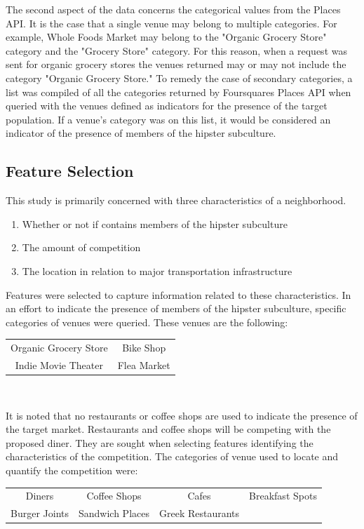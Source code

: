 \documentclass[12pt]{article}
\begin{document}
	The second aspect of the data concerns the categorical values from the Places API.
	It is the case that a single venue may belong to multiple categories.
	For example, Whole Foods Market may belong to the "Organic Grocery Store" category and the "Grocery Store" category.
	For this reason, when a request was sent for organic grocery stores the venues returned may or may not include the category "Organic Grocery Store."
	To remedy the case of secondary categories, a list was compiled of all the categories returned by Foursquares Places API when queried with the venues defined as indicators for the presence of the target population.
	If a venue's category was on this list, it would be considered an indicator of the presence of members of the hipster subculture.

\subsection{Feature Selection}
	This study is primarily concerned with three characteristics of a neighborhood.
	\begin{enumerate}[noitemsep]
		\item Whether or not if contains members of the hipster subculture
		\item The amount of competition
		\item The location in relation to major transportation infrastructure 
	\end{enumerate}
	
	Features were selected to capture information related to these characteristics.
	In an effort to indicate the presence of members of the hipster subculture, specific categories of venues were queried.
	These venues are the following: 
	\begin{center}	
	\begin{tabular}{ c c }
		Organic Grocery Store & Bike Shop \\
		Indie Movie Theater & Flea Market \\
	\end{tabular} \\
	\end{center}
	It is noted that no restaurants or coffee shops are used to indicate the presence of the target market.
	Restaurants and coffee shops will be competing with the proposed diner. 
	They are sought when selecting features identifying the characteristics of the competition.	
	The categories of venue used to locate and quantify the competition were: 
	\begin{center}
	\begin{tabular}{c c c c}
		Diners & Coffee Shops & Cafes & Breakfast Spots \\
		Burger Joints & Sandwich Places &Greek Restaurants \\
	\end{tabular}
	\end{center}
	
\end{document}
